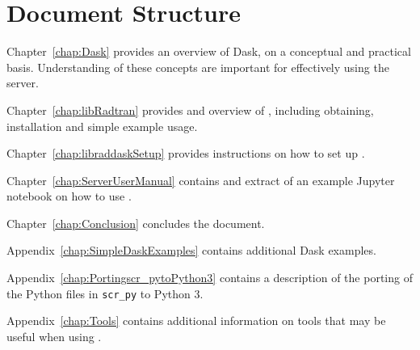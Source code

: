 \section{Document Structure}
\label{sec:DocumentStructure}

Chapter~\ref{chap:Dask} provides an overview of Dask, on a conceptual and practical basis.  Understanding of these concepts are important for effectively using the server.

Chapter~\ref{chap:libRadtran}  provides and overview of \libradtran{}, including obtaining, installation and simple example usage.

Chapter~\ref{chap:libraddaskSetup}  provides instructions on how to set up \libraddask{}.

Chapter~\ref{chap:ServerUserManual}  contains and extract of an example Jupyter notebook on how to use  \libraddask{}.

Chapter~\ref{chap:Conclusion} concludes the document.

Appendix~\ref{chap:SimpleDaskExamples} contains additional Dask examples.

Appendix~\ref{chap:Portingscr_pytoPython3}  contains a description of the porting of the \libradtran{} Python files in \lstinline{scr_py} to Python 3.

Appendix~\ref{chap:Tools}  contains additional information on tools that may be useful when using \libraddask{}.
